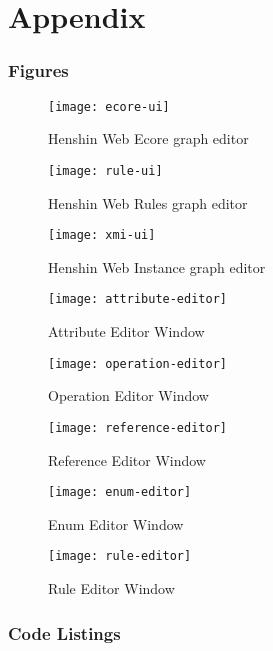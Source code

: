 \chapter{Appendix}
  \label{sec:appendix}

  \subsection{Figures}

  \begin{figure}[H]
    \centering
    \texttt{[image: ecore-ui]}
    \caption{Henshin Web Ecore graph editor}
    \label{fig:ecore-ui}
  \end{figure}

  \begin{figure}[H]
    \centering
    \texttt{[image: rule-ui]}
    \caption{Henshin Web Rules graph editor}
    \label{fig:rule-ui}
  \end{figure}

  \begin{figure}[H]
    \centering
    \texttt{[image: xmi-ui]}
    \caption{Henshin Web Instance graph editor}
    \label{fig:xmi-ui}
  \end{figure}

  \begin{figure}[h]
    \centering
    \texttt{[image: attribute-editor]}
    \caption{Attribute Editor Window}
    \label{fig:attribute-editor}
  \end{figure}
  \begin{figure}[h]
    \centering
    \texttt{[image: operation-editor]}
    \caption{Operation Editor Window}
    \label{fig:operation-editor}
  \end{figure}
  \begin{figure}[h]
    \centering
    \texttt{[image: reference-editor]}
    \caption{Reference Editor Window}
    \label{fig:reference-editor}
  \end{figure}
  \begin{figure}[h]
    \centering
    \texttt{[image: enum-editor]}
    \caption{Enum Editor Window}
    \label{fig:enum-editor}
  \end{figure}
    \begin{figure}[h]
    \centering
    \texttt{[image: rule-editor]}
    \caption{Rule Editor Window}
    \label{fig:rule-editor}
  \end{figure}

  \subsection{Code Listings}



